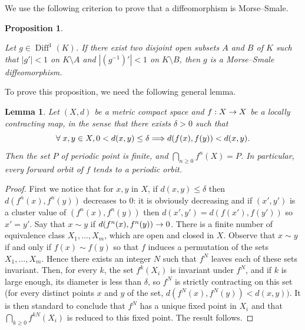 \documentclass[10pt]{amsart}
\newtheorem{lemm}[theo]{Lemma}\newtheorem{prop}[theo]{Proposition}\newtheorem{coro}[theo]{Corollary}\newtheorem{conj}[theo]{Conjecture}
\theoremstyle{definition}\newtheorem{defi}[theo]{Definition}\newtheorem{rema}[theo]{Remark}\newtheorem{exam}[theo]{Example}\newtheorem{exem}[theo]{Example}\newtheorem{nota}[theo]{Notation}
\DeclareMathOperator{\Diff}{Diff}
\renewcommand*{\to}{\mathchoice{\longrightarrow}{\rightarrow}{\rightarrow}{\rightarrow}}
\renewcommand*{\implies}{\mathchoice{\Longrightarrow}{\Rightarrow}{\Rightarrow}{\Rightarrow}}
\let\oldforall\forall
\renewcommand*{\forall}{\mathrel{\oldforall}}
\begin{document}
We use the following criterion to prove that a diffeomorphism is Morse--Smale.


\begin{prop}\label{MorseSmaleCriterium}

Let $g\in \Diff^1(K)$. If there exist two disjoint open subsets $A$ and $B$ of $K$ such that $|g'|<1$ on $K\setminus A$ and $|(g^{-1})'|<1$ on $K\setminus B$, then $g$ is a Morse--Smale diffeomorphism.
\end{prop}


To prove this proposition, we need the following general lemma.

\begin{lemm}\label{lemcontraction}
Let $(X,d)$ be a metric compact space and $f:X\to X$ be a locally contracting map, in the sense that there exists $\delta>0$ such that
\[
\forall x,y\in X, 0< d(x,y)\leq \delta \implies d(f(x),f(y))<d(x,y).
\]
Then the set $P$ of periodic point is finite, and $\bigcap_{n\ge 0}f^n(X)=P$. In particular, every forward orbit of $f$ tends to a periodic orbit.
\end{lemm}
\begin{proof}
First we notice that for $x,y$ in $X$, if $d(x,y)\leq \delta$ then $d(f^n(x),f^n(y))$ decreases to $0$: it is obviously decreasing and if $(x',y')$ is a cluster value of $(f^n(x),f^n(y))$ then $d(x',y')=d(f(x'),f(y'))$ so $x'=y'$. Say that $x\sim y$ if $d(f^n(x),f^n(y))\to 0$. There is a finite number of equivalence class $X_1,\dots,X_m$, which are open and closed in $X$. Observe that $x\sim y$ if and only if $f(x)\sim f(y)$ so that $f$ induces a permutation of the sets $X_1,\dots,X_m$. Hence there exists an integer $N$ such that $f^N$ leaves each of these sets invariant. Then, for every $k$, the set $f^k(X_i)$ is invariant under $f^N$, and if $k$ is large enough, its diameter is less than $\delta$, so $f^N$ is strictly contracting on this set (for every distinct points $x$ and $y$ of the set, $d(f^N(x),f^N(y))<d(x,y))$. It is then standard to conclude that $f^N$ has a unique fixed point in $X_i$ and that $\bigcap_{k\ge 0} f^{kN}(X_i)$ is reduced to this fixed point. The result follows.
\end{proof}
\end{document}
